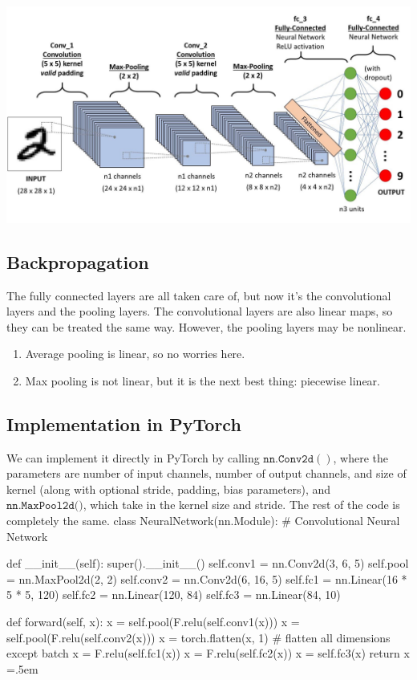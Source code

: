 \documentclass{article}
\newenvironment{cverbatim}
    {\SaveVerbatim{cverb}}
    {\endSaveVerbatim
      \flushleft\fboxrule=0pt\fboxsep=.5em
      \colorbox{cverbbg}{%
        \makebox[\dimexpr\linewidth-2\fboxsep][l]{\BUseVerbatim{cverb}}%
      }
      \endflushleft
  }
\theoremstyle{definition}
\theoremstyle{remark}
\theoremstyle{definition}
\begin{document}
    \begin{center}
        \includegraphics[scale=0.25]{img/CNNs/CNN_architecture.jpeg}
    \end{center}

    \subsection{Backpropagation}

    The fully connected layers are all taken care of, but now it's the convolutional layers and the pooling layers. The convolutional layers are also linear maps, so they can be treated the same way. However, the pooling layers may be nonlinear. 
    \begin{enumerate}
      \item Average pooling is linear, so no worries here. 
      \item Max pooling is not linear, but it is the next best thing: piecewise linear. 
    \end{enumerate}

    \subsection{Implementation in PyTorch}

    We can implement it directly in PyTorch by calling $\texttt{nn.Conv2d}()$, where the parameters are number of input channels, number of output channels, and size of kernel (along with optional stride, padding, bias parameters), and $\texttt{nn.MaxPool2d()}$, which take in the kernel size and stride. The rest of the code is completely the same. 
    \begin{cverbatim}
    class NeuralNetwork(nn.Module):
        # Convolutional Neural Network 

        def __init__(self):
            super().__init__()
            self.conv1 = nn.Conv2d(3, 6, 5)
            self.pool = nn.MaxPool2d(2, 2)
            self.conv2 = nn.Conv2d(6, 16, 5)
            self.fc1 = nn.Linear(16 * 5 * 5, 120)
            self.fc2 = nn.Linear(120, 84)
            self.fc3 = nn.Linear(84, 10)


        def forward(self, x):
            x = self.pool(F.relu(self.conv1(x)))
            x = self.pool(F.relu(self.conv2(x)))
            x = torch.flatten(x, 1) # flatten all dimensions except batch
            x = F.relu(self.fc1(x))
            x = F.relu(self.fc2(x))
            x = self.fc3(x)
            return x
    \end{cverbatim}
\end{document}
